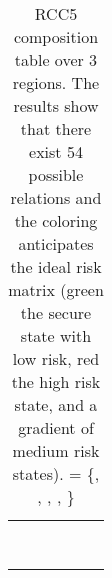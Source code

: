 \begin{table}[t]
\begin{adjustbox}{width=\textwidth}
\begin{tabular}{r||c|c|c|c|c}
	\cellcolor{abf-rg-3}&
	\cellcolor{abf-rg-4} & %
	\cellcolor{abf-rg-5}\po{$\assertionRegion$}{$\factRegion$} & %
	\cellcolor{abf-rg-6}\\ %
 & \cellcolor{abf-rg-2}\po{$\assertionRegion$}{$\factRegion$} & 
	\cellcolor{abf-rg-3}\po{$\assertionRegion$}{$\factRegion$} & 
	\cellcolor{abf-rg-4}\pp{$\assertionRegion$}{$\factRegion$} & %
	\cellcolor{abf-rg-5}\eq{$\assertionRegion$}{$\factRegion$} & %
	\cellcolor{abf-rg-6}\pp{$\assertionRegion$}{$\factRegion$} \\ %
 & \cellcolor{abf-rg-2}\pp{$\assertionRegion$}{$\factRegion$} & 
	\cellcolor{abf-rg-3}\pp{$\assertionRegion$}{$\factRegion$} & 
	\cellcolor{abf-rg-4} & %
	\cellcolor{abf-rg-5}\pp{$\assertionRegion$}{$\factRegion$} & %
	\cellcolor{abf-rg-6} \\ %
 & \cellcolor{abf-rg-2}&
 	\cellcolor{abf-rg-3} & 
	\cellcolor{abf-rg-4}& %
	\cellcolor{abf-rg-5}\ppi{$\assertionRegion$}{$\factRegion$} & %
	\cellcolor{abf-rg-6} \\ %
\hline %
 \multirow{3}{*}{\ppi{$\behaviorRegion$}{$\factRegion$}} &
 	\cellcolor{abf-rg-3}\multirow{3}{*}{} &
 	\cellcolor{abf-rg-4}\dr{$\assertionRegion$}{$\factRegion$} &
 	\cellcolor{abf-rg-5}& %
 	\cellcolor{abf-rg-6}& %
 	\cellcolor{abf-rg-7} \\ %
& \cellcolor{abf-rg-3}\dr{$\assertionRegion$}{$\factRegion$} &
 	\cellcolor{abf-rg-4}\po{$\assertionRegion$}{$\factRegion$} & 
 	\cellcolor{abf-rg-5}\all{$\assertionRegion$}{$\factRegion$}& %
 	\cellcolor{abf-rg-6}\ppi{$\assertionRegion$}{$\factRegion$}& %
 	\cellcolor{abf-rg-7}\ppi{$\assertionRegion$}{$\factRegion$}\\ %
& \cellcolor{abf-rg-3} & 
	\cellcolor{abf-rg-4}\ppi{$\assertionRegion$}{$\factRegion$} & 
	\cellcolor{abf-rg-5} & %
	\cellcolor{abf-rg-6}& %
	\cellcolor{abf-rg-7}\\ %
\hline %
	\eq{$\behaviorRegion$}{$\factRegion$} & 
	\cellcolor{abf-rg-4}\dr{$\assertionRegion$}{$\factRegion$} & 
	\cellcolor{abf-rg-5} \po{$\assertionRegion$}{$\factRegion$} & 
	\cellcolor{abf-rg-6}\pp{$\assertionRegion$}{$\factRegion$} & %
	\cellcolor{abf-rg-7} \ppi{$\assertionRegion$}{$\factRegion$} & %
	\cellcolor{abfgreen} \eq{$\assertionRegion$}{$\factRegion$}  %
\end{tabular}
\end{adjustbox}
\caption{RCC5 composition table over 3 regions. The results show that there
exist 54 possible relations and the coloring anticipates the ideal risk matrix
(green the secure state with low risk, red the high risk state, and a gradient
of medium risk states). 
\all{$\assertionRegion$}{$\factRegion$} = \{\dr{$\assertionRegion$}{$\factRegion$}, \po{$\assertionRegion$}{$\factRegion$}, \pp{$\assertionRegion$}{$\factRegion$}, \ppi{$\assertionRegion$}{$\factRegion$}, \eq{$\assertionRegion$}{$\factRegion$}\}
\label{tab:5com}}
\end{table}
